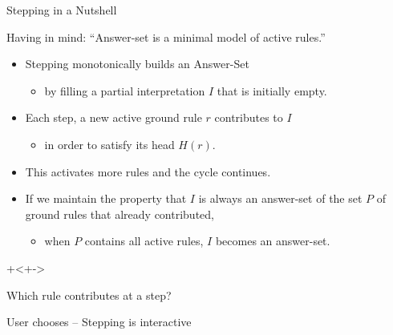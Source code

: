 \documentclass{beamer}
\begin{document}
\begin{frame}{Stepping in a Nutshell}
	\onslide<+->
	
	Having in mind: ``Answer-set is a minimal model of active rules.''
	
	\onslide<+->
	\begin{itemize}
		\item Stepping monotonically builds an Answer-Set
		\onslide<+->
		\begin{itemize}
			\item by filling a partial interpretation $I$ that is initially empty.
		\end{itemize}
		\onslide<+->
		\item Each step, a new active ground rule $r$ contributes to $I$
		\onslide<+->
		\begin{itemize}
			\item in order to satisfy its head $H(r)$.
		\end{itemize}
		\onslide<+->
		\item This activates more rules and the cycle continues.
		\onslide<+->
		\item If we maintain the property that $I$ is always an answer-set of
		the set $P$ of ground rules that already contributed,
		\onslide<+->
		\begin{itemize}
			\item when $P$ contains all active rules, $I$ becomes an answer-set.
		\end{itemize}
	\end{itemize}
	
	\onslide+<+->{\vspace{10pt}

		Which rule contributes at a step?

		\onslide<+->
		User chooses -- Stepping is interactive
	}
	
\end{frame}
\end{document}
